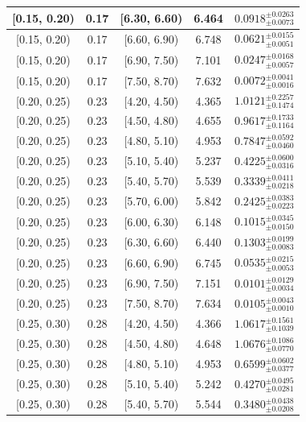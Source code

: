 \begin{longtable}{|c|c|c|c|c|}
\hline
[0.15, 0.20) & 0.17 & [6.30, 6.60) & 6.464 & $0.0918^{ \pm 0.0263 }_{ \pm 0.0073 }$ \\ 
\hline
[0.15, 0.20) & 0.17 & [6.60, 6.90) & 6.748 & $0.0621^{ \pm 0.0155 }_{ \pm 0.0051 }$ \\ 
\hline
[0.15, 0.20) & 0.17 & [6.90, 7.50) & 7.101 & $0.0247^{ \pm 0.0168 }_{ \pm 0.0057 }$ \\ 
\hline
[0.15, 0.20) & 0.17 & [7.50, 8.70) & 7.632 & $0.0072^{ \pm 0.0041 }_{ \pm 0.0016 }$ \\ 
\hline
[0.20, 0.25) & 0.23 & [4.20, 4.50) & 4.365 & $1.0121^{ \pm 0.2257 }_{ \pm 0.1474 }$ \\ 
\hline
[0.20, 0.25) & 0.23 & [4.50, 4.80) & 4.655 & $0.9617^{ \pm 0.1733 }_{ \pm 0.1164 }$ \\ 
\hline
[0.20, 0.25) & 0.23 & [4.80, 5.10) & 4.953 & $0.7847^{ \pm 0.0592 }_{ \pm 0.0460 }$ \\ 
\hline
[0.20, 0.25) & 0.23 & [5.10, 5.40) & 5.237 & $0.4225^{ \pm 0.0600 }_{ \pm 0.0316 }$ \\ 
\hline
[0.20, 0.25) & 0.23 & [5.40, 5.70) & 5.539 & $0.3339^{ \pm 0.0411 }_{ \pm 0.0218 }$ \\ 
\hline
[0.20, 0.25) & 0.23 & [5.70, 6.00) & 5.842 & $0.2425^{ \pm 0.0383 }_{ \pm 0.0223 }$ \\ 
\hline
[0.20, 0.25) & 0.23 & [6.00, 6.30) & 6.148 & $0.1015^{ \pm 0.0345 }_{ \pm 0.0150 }$ \\ 
\hline
[0.20, 0.25) & 0.23 & [6.30, 6.60) & 6.440 & $0.1303^{ \pm 0.0199 }_{ \pm 0.0083 }$ \\ 
\hline
[0.20, 0.25) & 0.23 & [6.60, 6.90) & 6.745 & $0.0535^{ \pm 0.0215 }_{ \pm 0.0053 }$ \\ 
\hline
[0.20, 0.25) & 0.23 & [6.90, 7.50) & 7.151 & $0.0101^{ \pm 0.0129 }_{ \pm 0.0034 }$ \\ 
\hline
[0.20, 0.25) & 0.23 & [7.50, 8.70) & 7.634 & $0.0105^{ \pm 0.0043 }_{ \pm 0.0010 }$ \\ 
\hline
[0.25, 0.30) & 0.28 & [4.20, 4.50) & 4.366 & $1.0617^{ \pm 0.1561 }_{ \pm 0.1039 }$ \\ 
\hline
[0.25, 0.30) & 0.28 & [4.50, 4.80) & 4.648 & $1.0676^{ \pm 0.1086 }_{ \pm 0.0770 }$ \\ 
\hline
[0.25, 0.30) & 0.28 & [4.80, 5.10) & 4.953 & $0.6599^{ \pm 0.0602 }_{ \pm 0.0377 }$ \\ 
\hline
[0.25, 0.30) & 0.28 & [5.10, 5.40) & 5.242 & $0.4270^{ \pm 0.0495 }_{ \pm 0.0281 }$ \\ 
\hline
[0.25, 0.30) & 0.28 & [5.40, 5.70) & 5.544 & $0.3480^{ \pm 0.0438 }_{ \pm 0.0208 }$ \\ 

\end{longtable}
